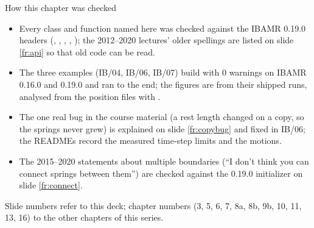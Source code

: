 \documentclass[aspectratio=169,11pt]{beamer}
\begin{document}
\begin{frame}{How this chapter was checked}
\label{fr:checked}
\begin{itemize}\footnotesize
  \item Every class and function named here was checked against the IBAMR 0.19.0 headers (, , , , ); the 2012--2020 lectures' older spellings are listed on slide \ref{fr:api} so that old code can be read.
  \item The three examples (IB/04, IB/06, IB/07) build with 0 warnings on IBAMR 0.16.0 and 0.19.0 and ran to the end; the figures are from their shipped runs, analysed from the  position files with .
  \item The one real bug in the course material (a rest length changed on a copy, so the springs never grew) is explained on slide \ref{fr:copybug} and fixed in IB/06; the READMEs record the measured time-step limits and the motions.
  \item The 2015--2020 statements about multiple boundaries (``I don't think you can connect springs between them'') are checked against the 0.19.0 initializer on slide \ref{fr:connect}.
\end{itemize}
\begin{punchbox}
\footnotesize Slide numbers refer to this deck; chapter numbers (3, 5, 6, 7, 8a, 8b, 9b, 10, 11, 13, 16) to the other chapters of this series.
\end{punchbox}
\end{frame}
\end{document}

